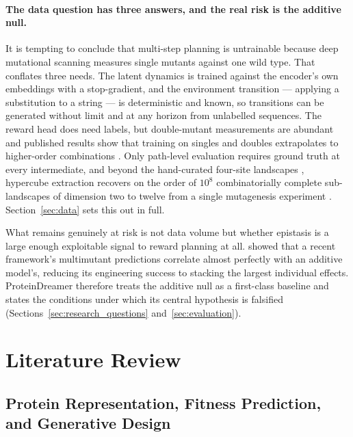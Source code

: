 \documentclass[12pt, a4paper]{article}
\begin{document}
\paragraph{The data question has three answers, and the real risk is the additive null.} It is tempting to conclude that multi-step planning is untrainable because deep mutational scanning measures single mutants against one wild type. That conflates three needs. The latent dynamics is trained against the encoder's own embeddings with a stop-gradient, and the environment transition --- applying a substitution to a string --- is deterministic and known, so transitions can be generated without limit and at any horizon from unlabelled sequences. The reward head does need labels, but double-mutant measurements are abundant \citep{olson2014gb1} and published results show that training on singles and doubles extrapolates to higher-order combinations \citep{tran2026multievolve, wang2026atlas}. Only path-level evaluation requires ground truth at every intermediate, and beyond the hand-curated four-site landscapes \citep{wu2016indirect, johnston2024trpb, podgornaia2015phoq}, hypercube extraction recovers on the order of $10^8$ combinatorially complete sub-landscapes of dimension two to twelve from a single mutagenesis experiment \citep{esteban2019hypercubeme}. Section~\ref{sec:data} sets this out in full.

What remains genuinely at risk is not data volume but whether epistasis is a large enough exploitable signal to reward planning at all. \citet{visani2026additive} showed that a recent framework's multimutant predictions correlate almost perfectly with an additive model's, reducing its engineering success to stacking the largest individual effects. ProteinDreamer therefore treats the additive null as a first-class baseline and states the conditions under which its central hypothesis is falsified (Sections~\ref{sec:research_questions} and~\ref{sec:evaluation}).

\section{Literature Review}
\label{sec:literature}

\subsection{Protein Representation, Fitness Prediction, and Generative Design}
\end{document}
